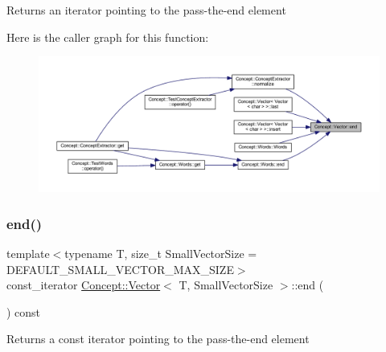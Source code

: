\begin{DoxyReturn}{Returns}
an iterator pointing to the pass-\/the-\/end element 
\end{DoxyReturn}
Here is the caller graph for this function\+:\nopagebreak
\begin{figure}[H]
\begin{center}
\leavevmode
\includegraphics[width=350pt]{class_concept_1_1_vector_acf6f0b48aa0ecbd09e327d6b173d9ed8_icgraph}
\end{center}
\end{figure}
\mbox{\label{class_concept_1_1_vector_aa9a137bf9a8054ff5a5d543f45583fe5}} 
\subsubsection{\texorpdfstring{end()}{end()}\hspace{0.1cm}{\footnotesize\ttfamily [2/2]}}
{\footnotesize\ttfamily template$<$typename T, size\+\_\+t Small\+Vector\+Size = D\+E\+F\+A\+U\+L\+T\+\_\+\+S\+M\+A\+L\+L\+\_\+\+V\+E\+C\+T\+O\+R\+\_\+\+M\+A\+X\+\_\+\+S\+I\+ZE$>$ \\
const\+\_\+iterator \mbox{\hyperlink{class_concept_1_1_vector}{Concept\+::\+Vector}}$<$ T, Small\+Vector\+Size $>$\+::end (\begin{DoxyParamCaption}{ }\end{DoxyParamCaption}) const\hspace{0.3cm}{\ttfamily [inline]}}

\begin{DoxyReturn}{Returns}
a const iterator pointing to the pass-\/the-\/end element 
\end{DoxyReturn}
\mbox{\label{class_concept_1_1_vector_a5c4b45f64ca14b02d544513c5b8ccbcd}} 
